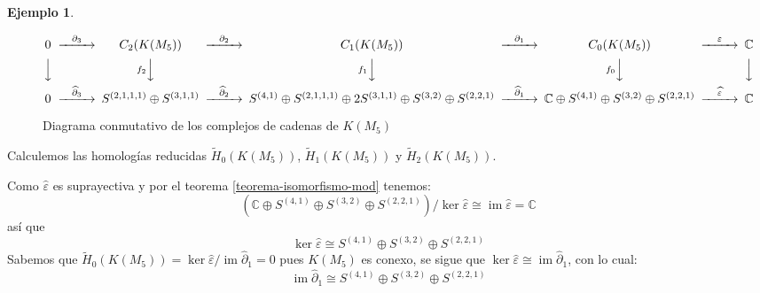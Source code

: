 \documentclass[12pt]{book}
\theoremstyle{definition}
\newtheorem{example}[theorem]{Ejemplo}
\DeclareMathOperator{\im}{im}
\newcounter{in}
\begin{document}
\begin{example}
\begin{sidewaysfigure}%
  {\small
  \[
  \begin{CD}
    0 @>{\partial_{3}}>> C_{2}(K(M_{5})) @>{\partial_{2}}>> C_{1}(K(M_{5})) @>{\partial_{1}}>> C_{0}(K(M_{5})) @>{\varepsilon}>> \mathbb{C}\\
    @VVV   @Vf_{2}VV   @Vf_{1}VV  @Vf_{0}VV  @VVV    \\
    0 @>{\widehat\partial_{3}}>> S^{(2,1,1,1)}\oplus S^{(3,1,1)}
    @>{\widehat\partial_{2}}>> S^{(4,1)}\oplus S^{(2,1,1,1)}\oplus
    2S^{(3,1,1)}\oplus S^{(3,2)} \oplus S^{(2,2,1)}
    @>{\widehat\partial_{1}}>> \mathbb{C}\oplus S^{(4,1)}\oplus
    S^{(3,2)}\oplus S^{(2,2,1)}@>{\widehat \varepsilon}>> \mathbb{C}
  \end{CD}
  \]
   }
  
  \caption{Diagrama conmutativo de los complejos de cadenas de $K(M_{5})$}
  \label{fig:diagrama-conmutativo-clanes5}
\end{sidewaysfigure}

Calculemos las homologías reducidas $\widetilde H_{0}(K(M_{5}))$,
$\widetilde H_{1}(K(M_{5}))$ y $\widetilde H_{2}(K(M_{5}))$.

Como $\widehat\varepsilon$ es suprayectiva y por el teorema \ref{teorema-isomorfismo-mod} tenemos:
\begin{equation*}
  (\mathbb{C}\oplus S^{(4,1)}\oplus S^{(3,2)}\oplus
  S^{(2,2,1)})/\ker\widehat\varepsilon\cong \im \widehat\varepsilon=\mathbb{C}
\end{equation*}
así que
\begin{equation*}
  \label{ker0-KM5}
  \ker\widehat\varepsilon\cong S^{(4,1)} \oplus S^{(3,2)}\oplus S^{(2,2,1)}
\end{equation*}
Sabemos que $\widetilde H_{0}(K(M_{5}))=\ker \widehat\varepsilon/\im
\widehat\partial_{1}=0$ pues $K(M_{5})$ es conexo, se sigue que $\ker \widehat\varepsilon\cong
\im\widehat\partial_{1}$, con lo cual:
\begin{equation}
  \label{im1-KM5}
  \im \widehat\partial_{1}\cong S^{(4,1)} \oplus S^{(3,2)}\oplus S^{(2,2,1)}
\end{equation}


\end{example}
\end{document}
